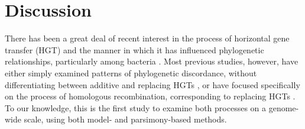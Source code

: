 \documentclass[12pt]{article}
\begin{document}

\section*{Discussion}

There has been a great deal of recent interest in the process of horizontal
gene transfer (HGT) and the manner in which it has influenced phylogenetic
relationships, particularly among bacteria \citep{}.  Most previous studies,
however, have either simply examined patterns of phylogenetic discordance,
without differentiating between additive and replacing HGTs \citep{}, or
have focused specifically on the process of homologous recombination,
corresponding to replacing HGTs
\citep{Didelot2007,Didelot2010}.
To our knowledge, this is the first study to examine both
processes on a genome-wide scale, using both model- and parsimony-based
methods.  
\end{document}

